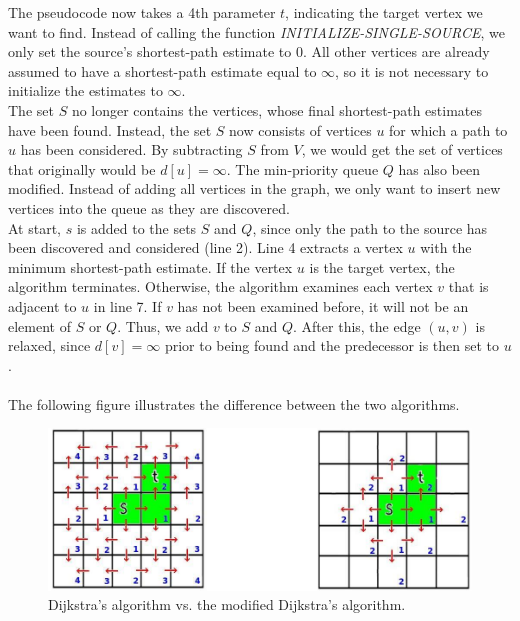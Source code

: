 \documentclass[11pt]{article}
\begin{document}
\noindent The pseudocode now takes a 4th parameter $t$, indicating the target vertex we want to find. Instead of calling the function \textit{INITIALIZE-SINGLE-SOURCE}, we only set the source's shortest-path estimate to 0. All other vertices are already assumed to have a shortest-path estimate equal to $\infty$, so it is not necessary to initialize the estimates to $\infty$.\\

\noindent The set $S$ no longer contains the vertices, whose final shortest-path estimates have been found. Instead, the set $S$ now consists of vertices $u$ for which a path to $u$ has been considered. By subtracting $S$ from $V$, we would get the set of vertices that originally would be $d[u]=\infty$. The min-priority queue $Q$ has also been modified. Instead of adding all vertices in the graph, we only want to insert new vertices into the queue as they are discovered.\\ 

\noindent At start, $s$ is added to the sets $S$ and $Q$, since only the path to the source has been discovered and considered (line 2). Line 4 extracts a vertex $u$ with the minimum shortest-path estimate. If the vertex $u$ is the target vertex, the algorithm terminates. Otherwise, the algorithm examines each vertex $v$ that is adjacent to $u$ in line 7. If $v$ has not been examined before, it will not be an element of $S$ or $Q$. Thus, we add $v$ to $S$ and $Q$. After this, the edge $(u,v)$ is relaxed, since $d[v]=\infty$ prior to being found and the predecessor is then set to $u$.\\\\
The following figure illustrates the difference between the two algorithms.\\
\begin{figure}[H]
\centering
\includegraphics[scale=0.4]{Pictures/Comparison0.jpg}
\caption{Dijkstra's algorithm vs. the modified Dijkstra's algorithm.}
\end{figure}
\end{document}
